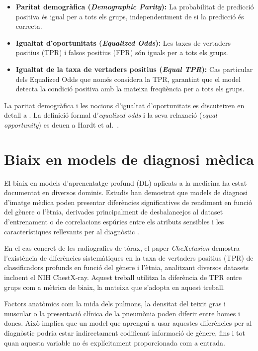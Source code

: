 \documentclass[a4paper,12pt,twoside]{ThesisStyle}
\begin{document}
\begin{itemize}
    \item \textbf{Paritat demogràfica (\textit{Demographic Parity}):} La probabilitat de predicció positiva és igual per a tots els grups, independentment de si la predicció és correcta.
    \item \textbf{Igualtat d'oportunitats (\textit{Equalized Odds}):} Les taxes de vertaders positius (TPR) i falsos positius (FPR) són iguals per a tots els grups.
    \item \textbf{Igualtat de la taxa de vertaders positius (\textit{Equal TPR}):} Cas particular dels Equalized Odds que només considera la TPR, garantint que el model detecta la condició positiva amb la mateixa freqüència per a tots els grups.
\end{itemize}

La paritat demogràfica i les nocions d'igualtat d'oportunitats es discuteixen en detall a \cite{Barocas2023}. La definició formal d'\textit{equalized odds} i la seva relaxació (\textit{equal opportunity}) es deuen a Hardt et al.\ \cite{Hardt2016}.

\section{Biaix en models de diagnosi mèdica}

El biaix en models d'aprenentatge profund (DL) aplicats a la medicina ha estat documentat en diversos dominis. Estudis han demostrat que models de diagnosi d'imatge mèdica poden presentar diferències significatives de rendiment en funció del gènere o l'ètnia, derivades principalment de desbalancejos al dataset d'entrenament o de correlacions espúries entre els atributs sensibles i les característiques rellevants per al diagnòstic \cite{Larrazabal2020}.

En el cas concret de les radiografies de tòrax, el paper \textit{CheXclusion} \cite{SeyyedKalantari2021} demostra l'existència de diferències sistemàtiques en la taxa de vertaders positius (TPR) de classificadors profunds en funció del gènere i l'ètnia, analitzant diversos datasets incloent el NIH ChestX-ray. Aquest treball utilitza la diferència de TPR entre grups com a mètrica de biaix, la mateixa que s'adopta en aquest treball.

Factors anatòmics com la mida dels pulmons, la densitat del teixit gras i muscular o la presentació clínica de la pneumònia poden diferir entre homes i dones. Això implica que un model que aprengui a usar aquestes diferències per al diagnòstic podria estar indirectament codificant informació de gènere, fins i tot quan aquesta variable no és explícitament proporcionada com a entrada.
\end{document}
